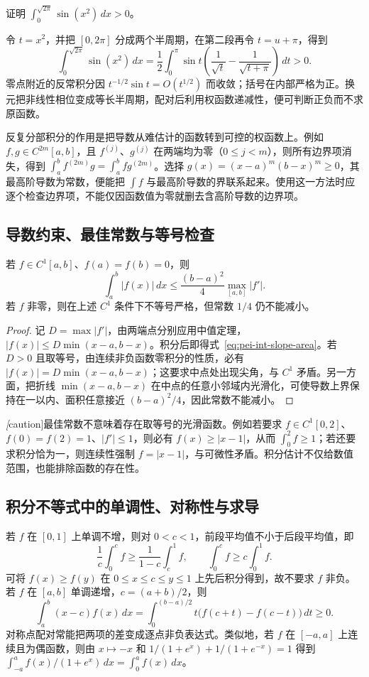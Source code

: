 \begin{example}
证明 $\displaystyle\int_0^{\sqrt{2\pi}}\sin(x^2)\,dx>0$。
\end{example}
\begin{solve}
令 $t=x^2$，并把 $[0,2\pi]$ 分成两个半周期，在第二段再令 $t=u+\pi$，得到
\[
 \int_0^{\sqrt{2\pi}}\sin(x^2)\,dx
 =\frac12\int_0^\pi\sin t\left(\frac1{\sqrt t}-\frac1{\sqrt{t+\pi}}\right)\,dt>0.
\]
零点附近的反常积分因 $t^{-1/2}\sin t=O(t^{1/2})$ 而收敛；括号在内部严格为正。换元把非线性相位变成等长半周期，配对后利用权函数递减性，便可判断正负而不求原函数。
\end{solve}
反复分部积分的作用是把导数从难估计的函数转到可控的权函数上。例如 $f,g\in C^{2m}[a,b]$，且 $f^{(j)}$、$g^{(j)}$ 在两端均为零（$0\le j<m$），则所有边界项消失，得到 $\int_a^bf^{(2m)}g=\int_a^bfg^{(2m)}$。选择 $g(x)=(x-a)^m(b-x)^m\ge0$，其最高阶导数为常数，便能把 $\int f$ 与最高阶导数的界联系起来。使用这一方法时应逐个检查边界项，不能仅因函数值为零就删去含高阶导数的边界项。

\subsection{导数约束、最佳常数与等号检查}
\begin{proposition}
\label{prop:pei-int-endpoint-slope}
若 $f\in C^1[a,b]$、$f(a)=f(b)=0$，则
\begin{equation}
 \int_a^b|f(x)|\,dx\le\frac{(b-a)^2}{4}\max_{[a,b]}|f'|.
 \label{eq:pei-int-slope-area}
\end{equation}
若 $f$ 非零，则在上述 $C^1$ 条件下不等号严格，但常数 $1/4$ 仍不能减小。
\end{proposition}
\begin{proof}
记 $D=\max|f'|$，由两端点分别应用中值定理，$|f(x)|\le D\min(x-a,b-x)$。积分后即得式~\eqref{eq:pei-int-slope-area}。若 $D>0$ 且取等号，由连续非负函数零积分的性质，必有 $|f(x)|=D\min(x-a,b-x)$；这要求中点处出现尖角，与 $C^1$ 矛盾。另一方面，把折线 $\min(x-a,b-x)$ 在中点的任意小邻域内光滑化，可使导数上界保持在一以内、面积任意接近 $(b-a)^2/4$，因此常数不能减小。
\end{proof}
\emph[caution]{最佳常数不意味着存在取等号的光滑函数}。例如若要求 $f\in C^1[0,2]$、$f(0)=f(2)=1$、$|f'|\le1$，则必有 $f(x)\ge|x-1|$，从而 $\int_0^2f\ge1$；若还要求积分恰为一，则连续性强制 $f=|x-1|$，与可微性矛盾。积分估计不仅给数值范围，也能排除函数的存在性。

\subsection{积分不等式中的单调性、对称性与求导}
若 $f$ 在 $[0,1]$ 上单调不增，则对 $0<c<1$，前段平均值不小于后段平均值，即
\[
 \frac1c\int_0^cf\ge\frac1{1-c}\int_c^1f,
 \qquad \int_0^cf\ge c\int_0^1f.
\]
可将 $f(x)\ge f(y)$ 在 $0\le x\le c\le y\le1$ 上先后积分得到，故不要求 $f$ 非负。若 $f$ 在 $[a,b]$ 单调递增，$c=(a+b)/2$，则
\[
 \int_a^b(x-c)f(x)\,dx
 =\int_0^{(b-a)/2}t\bigl(f(c+t)-f(c-t)\bigr)\,dt\ge0.
\]
对称点配对常能把两项的差变成逐点非负表达式。类似地，若 $f$ 在 $[-a,a]$ 上连续且为偶函数，则由 $x\mapsto-x$ 和 $1/(1+e^x)+1/(1+e^{-x})=1$ 得到 $\int_{-a}^a f(x)/(1+e^x)\,dx=\int_0^af(x)\,dx$。

